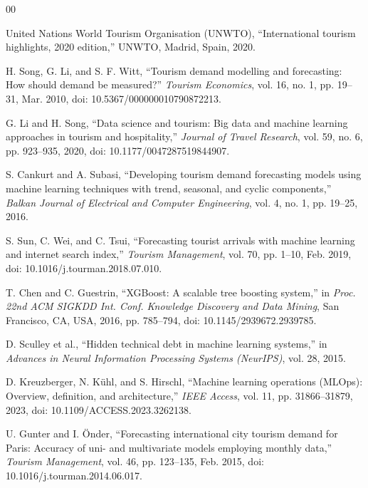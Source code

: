 \documentclass[conference]{IEEEtran}
\begin{document}
\begin{thebibliography}{00}

United Nations World Tourism Organisation (UNWTO),
``International tourism highlights, 2020 edition,''
UNWTO, Madrid, Spain, 2020.

H. Song, G. Li, and S. F. Witt,
``Tourism demand modelling and forecasting: How should
demand be measured?''
\textit{Tourism Economics}, vol. 16, no. 1, pp. 19--31,
Mar. 2010, doi: 10.5367/000000010790872213.

G. Li and H. Song,
``Data science and tourism: Big data and machine
learning approaches in tourism and hospitality,''
\textit{Journal of Travel Research},
vol. 59, no. 6, pp. 923--935, 2020,
doi: 10.1177/0047287519844907.

S. Cankurt and A. Subasi,
``Developing tourism demand forecasting models using
machine learning techniques with trend, seasonal, and
cyclic components,''
\textit{Balkan Journal of Electrical and Computer
Engineering}, vol. 4, no. 1, pp. 19--25, 2016.

S. Sun, C. Wei, and C. Tsui,
``Forecasting tourist arrivals with machine learning and
internet search index,''
\textit{Tourism Management}, vol. 70, pp. 1--10, Feb.
2019, doi: 10.1016/j.tourman.2018.07.010.

T. Chen and C. Guestrin,
``XGBoost: A scalable tree boosting system,''
in \textit{Proc. 22nd ACM SIGKDD Int. Conf. Knowledge
Discovery and Data Mining}, San Francisco, CA, USA,
2016, pp. 785--794, doi: 10.1145/2939672.2939785.

D. Sculley et al.,
``Hidden technical debt in machine learning systems,''
in \textit{Advances in Neural Information Processing
Systems (NeurIPS)}, vol. 28, 2015.

D. Kreuzberger, N. Kühl, and S. Hirschl,
``Machine learning operations (MLOps): Overview,
definition, and architecture,''
\textit{IEEE Access}, vol. 11, pp. 31866--31879, 2023,
doi: 10.1109/ACCESS.2023.3262138.

U. Gunter and I. Önder,
``Forecasting international city tourism demand for
Paris: Accuracy of uni- and multivariate models
employing monthly data,''
\textit{Tourism Management}, vol. 46, pp. 123--135,
Feb. 2015, doi: 10.1016/j.tourman.2014.06.017.


\end{thebibliography}
\end{document}
